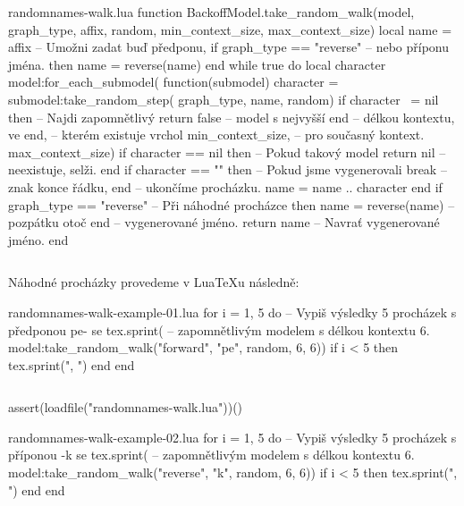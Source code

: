 \documentclass{csbulletin}
\let\exampleoutput\emph
\newcommand\myinputminted[3][]{%
  \inputminted[#1]{#2}{#3}%
}
\newcommand\myinputminted[3][]{%
  \inputminted[#1]{#2}{code-placeholder.#2}%
}
\begin{document}
\begin{filecontents}{randomnames-walk.lua}
function BackoffModel.take_random_walk(model, graph_type,
                                       affix, random,
                                       min_context_size,
                                       max_context_size)
  local name = affix              -- Umožni zadat buď předponu,
  if graph_type == "reverse"      -- nebo příponu jména.
    then name = reverse(name)
  end
  while true do
    local character
    model:for_each_submodel(
      function(submodel)
        character = submodel:take_random_step(
          graph_type, name, random)
        if character ~= nil then  -- Najdi zapomnětlivý
          return false            -- model s nejvyšší
        end                       -- délkou kontextu, ve
      end,                        -- kterém existuje vrchol
      min_context_size,           -- pro současný kontext.
      max_context_size)
    if character == nil then      -- Pokud takový model
      return nil                  -- neexistuje, selži.
    end
    if character == "\n" then     -- Pokud jsme vygenerovali
      break                       -- znak konce řádku,
    end                           -- ukončíme procházku.
    name = name .. character
  end
  if graph_type == "reverse"      -- Při náhodné procházce
    then name = reverse(name)     -- pozpátku otoč
  end                             -- vygenerované jméno.
  return name                     -- Navrať vygenerované jméno.
end
\end{filecontents}
\myinputminted{lua}{randomnames-walk.lua}

Náhodné procházky provedeme v Lua\TeX u následně:

\begin{filecontents}{randomnames-walk-example-01.lua}
for i = 1, 5 do -- Vypiš výsledky 5 procházek s předponou pe- se
  tex.sprint(   -- zapomnětlivým modelem s délkou kontextu 6.
    model:take_random_walk("forward", "pe", random, 6, 6))
  if i < 5 then tex.sprint(", ") end
end
\end{filecontents}
\myinputminted[linenos=false]{lua}{randomnames-walk-example-01.lua}

\noindent
\begin{luacode*}
assert(loadfile("randomnames-walk.lua"))()
\end{luacode*}
\exampleoutput{}

\begin{filecontents}{randomnames-walk-example-02.lua}
for i = 1, 5 do -- Vypiš výsledky 5 procházek s příponou -k se
  tex.sprint(   -- zapomnětlivým modelem s délkou kontextu 6.
    model:take_random_walk("reverse", "k", random, 6, 6))
  if i < 5 then tex.sprint(", ") end
end
\end{filecontents}
\myinputminted[linenos=false]{lua}{randomnames-walk-example-02.lua}
\end{document}
